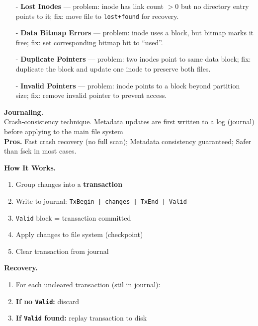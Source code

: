 \documentclass[8pt]{extarticle}
\begin{document}
\begin{minipage}[t]{0.5\textwidth}
\begin{itemize}[noitemsep,topsep=0pt]
    \item[-] \textbf{Lost Inodes} — problem: inode has link count $ > 0$ but no directory entry points to it; fix: move file to \texttt{lost+found} for recovery.
    
    \item[-] \textbf{Data Bitmap Errors} — problem: inode uses a block, but bitmap marks it free; fix: set corresponding bitmap bit to “used”.
    
    \item[-] \textbf{Duplicate Pointers} — problem: two inodes point to same data block; fix: duplicate the block and update one inode to preserve both files.
    
    \item[-] \textbf{Invalid Pointers} — problem: inode points to a block beyond partition size; fix: remove invalid pointer to prevent access.
\end{itemize}
\noindent\textbf{Journaling.} \\
Crash-consistency technique. Metadata updates are first written to a log (journal) before applying to the main file system\\
\noindent\textbf{Pros.} Fast crash recovery (no full scan); Metadata consistency guaranteed; Safer than fsck in most cases.\\
\begin{minipage}[t]{0.48\textwidth}
\noindent\textbf{How It Works.}
\begin{enumerate}[noitemsep,topsep=0pt]
    \item Group changes into a \textbf{transaction}
    \item Write to journal: \texttt{TxBegin | changes | TxEnd | Valid}
    \item \texttt{Valid} block = transaction committed
    \item Apply changes to file system (checkpoint)
    \item Clear transaction from journal
\end{enumerate}
\end{minipage}
\hfill
\begin{minipage}[t]{0.48\textwidth}
\noindent\textbf{Recovery.}
\begin{enumerate}[noitemsep,topsep=0pt]
    \item For each uncleared transaction (stil in journal): 
    \item \textbf{If no \texttt{Valid}:} discard
    \item \textbf{If \texttt{Valid} found:} replay transaction to disk

\end{enumerate}
\end{minipage}
\end{minipage}
\end{document}
